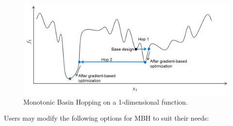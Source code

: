 
\begin{figure}
	\centering
	\includegraphics[width=0.8\linewidth]{../../shared_latex_inputs/images/MBH.png}
	\caption{Monotonic Basin Hopping on a 1-dimensional function.}
	\label{fig:MBH}
\end{figure}

\noindent Users may modify the following options for \ac{MBH} to suit their needs: \\

